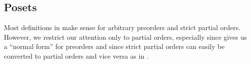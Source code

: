 \subsection{Posets}\label{subsec:posets}

\begin{remark}\label{remark:only_partial_orders}
  Most definitions in  make sense for arbitrary preorders and strict partial orders. However, we restrict our attention only to partial orders, especially since  gives us a \enquote{normal form} for preorders and since strict partial orders can easily be converted to partial orders and vice versa as in .
\end{remark}

